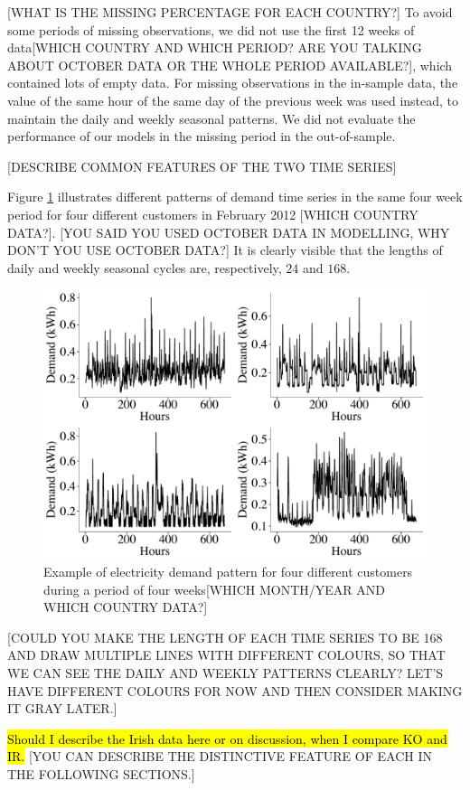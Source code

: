 \documentclass[preprint,3p,12pt,authoryear]{elsarticle}
\begin{document}
[WHAT IS THE MISSING PERCENTAGE FOR EACH COUNTRY?] To avoid some periods of missing observations, we did not use the first 12 weeks of data[WHICH COUNTRY AND WHICH PERIOD? ARE YOU TALKING ABOUT OCTOBER DATA OR THE WHOLE PERIOD AVAILABLE?], which contained lots of empty data.
For missing observations in the in-sample data, the value of the same hour of the same day of the previous week was used instead, to maintain the daily and weekly seasonal patterns. We did not evaluate the performance of our models in the missing period in the out-of-sample.

[DESCRIBE COMMON FEATURES OF THE TWO TIME SERIES]

Figure \ref{fig:4weeks} illustrates different patterns of demand time series in the same four week period for four different customers in February 2012 [WHICH COUNTRY DATA?]. [YOU SAID YOU USED OCTOBER DATA IN MODELLING, WHY DON'T YOU USE OCTOBER DATA?]
It  is clearly visible that the lengths of daily and weekly seasonal cycles are, respectively, \(24\) and \(168\).
\begin{figure}
  \centering
  \includegraphics[width=0.8\columnwidth]{2017-10-13_compare_demands_bw2}
  \caption{Example of electricity demand pattern for four different customers during a period of four weeks[WHICH MONTH/YEAR AND WHICH COUNTRY DATA?]}
  \label{fig:4weeks}
\end{figure}

[COULD YOU MAKE THE LENGTH OF EACH TIME SERIES TO BE 168 AND DRAW MULTIPLE LINES WITH DIFFERENT COLOURS, SO THAT WE CAN SEE THE DAILY AND WEEKLY PATTERNS CLEARLY? LET'S HAVE DIFFERENT COLOURS FOR NOW AND THEN CONSIDER MAKING IT GRAY LATER.]


\hl{Should I describe the Irish data here or on discussion, when I compare KO and IR.}
[YOU CAN DESCRIBE THE DISTINCTIVE FEATURE OF EACH IN THE FOLLOWING SECTIONS.]
\end{document}
